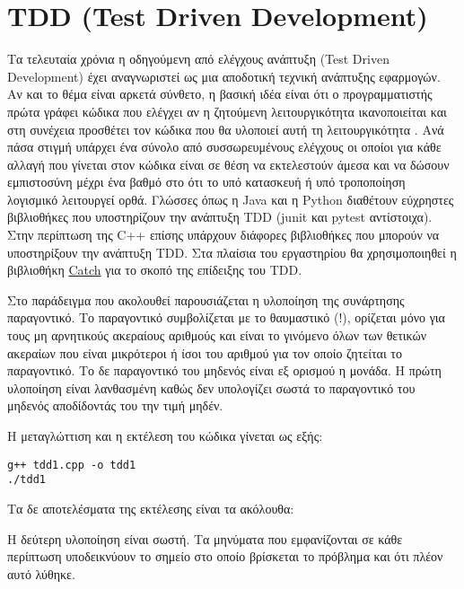


\section{TDD (Test Driven Development)}
Τα τελευταία χρόνια η οδηγούμενη από ελέγχους ανάπτυξη (Test Driven Development) έχει αναγνωριστεί ως μια αποδοτική τεχνική ανάπτυξης εφαρμογών. Αν και το θέμα είναι αρκετά σύνθετο, η βασική ιδέα είναι ότι ο προγραμματιστής πρώτα γράφει κώδικα που ελέγχει αν η ζητούμενη λειτουργικότητα ικανοποιείται και στη συνέχεια προσθέτει τον κώδικα που θα υλοποιεί αυτή τη λειτουργικότητα \cite{butunclebob_tdd}. Ανά πάσα στιγμή υπάρχει ένα σύνολο από συσσωρευμένους ελέγχους οι οποίοι για κάθε αλλαγή που γίνεται στον κώδικα είναι σε θέση να εκτελεστούν άμεσα και να δώσουν εμπιστοσύνη μέχρι ένα βαθμό στο ότι το υπό κατασκευή ή υπό τροποποίηση λογισμικό λειτουργεί ορθά. Γλώσσες όπως η Java και η Python διαθέτουν εύχρηστες βιβλιοθήκες που υποστηρίζουν την ανάπτυξη TDD (junit και pytest αντίστοιχα). Στην περίπτωση της C++ επίσης υπάρχουν διάφορες βιβλιοθήκες που μπορούν να υποστηρίξουν την ανάπτυξη TDD. Στα πλαίσια του εργαστηρίου θα χρησιμοποιηθεί η βιβλιοθήκη \href{https://github.com/philsquared/Catch}{Catch} για το σκοπό της επίδειξης του TDD.

Στο παράδειγμα που ακολουθεί παρουσιάζεται η υλοποίηση της συνάρτησης παραγοντικό. Το παραγοντικό συμβολίζεται με το θαυμαστικό (!), ορίζεται μόνο για τους μη αρνητικούς ακεραίους αριθμούς και είναι το γινόμενο όλων των θετικών ακεραίων που είναι μικρότεροι ή ίσοι του αριθμού για τον οποίο ζητείται το παραγοντικό. Το δε παραγοντικό του μηδενός είναι εξ ορισμού η μονάδα. Η πρώτη υλοποίηση είναι λανθασμένη καθώς δεν υπολογίζει σωστά το παραγοντικό του μηδενός αποδίδοντάς του την τιμή μηδέν. 



Η μεταγλώττιση και η εκτέλεση του κώδικα γίνεται ως εξής:
\begin{lstlisting}[style=DOS]
g++ tdd1.cpp -o tdd1
./tdd1
\end{lstlisting}

Τα δε αποτελέσματα της εκτέλεσης είναι τα ακόλουθα:



Η δεύτερη υλοποίηση είναι σωστή. Τα μηνύματα που εμφανίζονται σε κάθε περίπτωση υποδεικνύουν το σημείο στο οποίο βρίσκεται το πρόβλημα και ότι πλέον αυτό λύθηκε.

